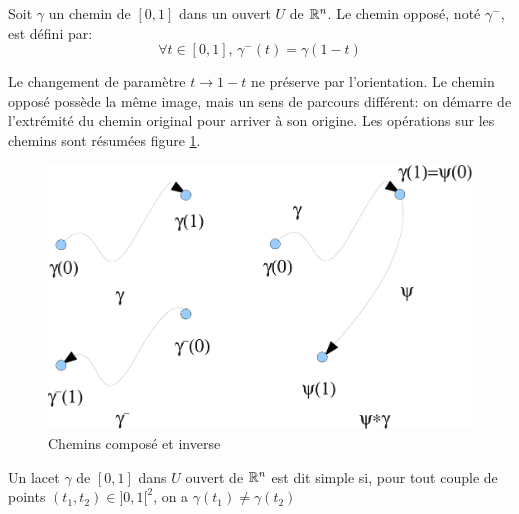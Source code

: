 \begin{fdefn}
Soit $\gamma$ un chemin de $[0,1]$ dans un ouvert $U$ de $\mathbb{R}^n$. Le chemin opposé, noté
$\gamma^-$, est défini par:
\[
\forall t \in [0,1], \, \gamma^-(t) = \gamma(1-t)
\]
\end{fdefn}
Le changement de paramètre $t \to 1-t$ ne préserve par l'orientation. 
Le chemin opposé possède la même image, mais un sens de parcours différent: on
démarre de l’extrémité du chemin original pour arriver à son origine. 
Les opérations sur les chemins sont résumées figure \ref{ch8:fig1}.
\begin{figure}[ht]
\includegraphics[scale=0.4]{images/chemins.pdf}
\caption{Chemins composé et inverse}\label{ch8:fig1}
\end{figure}

\begin{fdefn}
Un lacet $\gamma$ de $[0,1]$ dans $U$ ouvert de $\mathbb{R}^n$ est dit simple si, pour tout couple de points $(t_1,t_2) \in ]0,1[^2$, on a
$\gamma(t_1) \neq \gamma(t_2)$
\end{fdefn}

